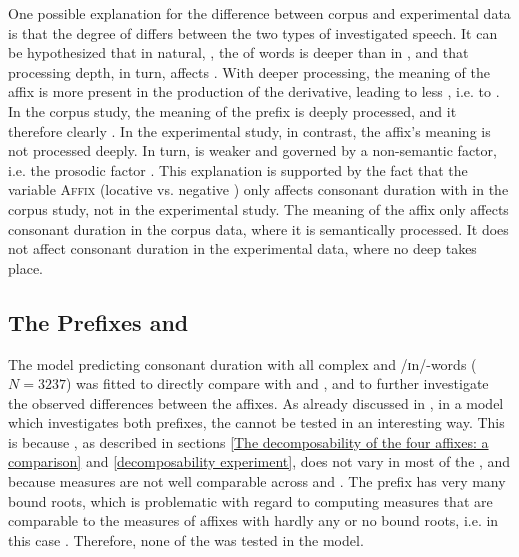 One possible explanation for the difference between corpus and experimental data is that the degree of  differs between the two types of investigated speech. It can be hypothesized that in natural, ,  the  of words is deeper than in , and that processing depth, in turn, affects . With deeper processing, the meaning of the affix is more present in the production of the derivative, leading to less , i.e. to . 
 In the corpus study, the meaning of the prefix is deeply processed, and it therefore clearly . In the experimental study, in contrast, the affix's meaning is not processed deeply. In turn,  is weaker and governed by a non-semantic factor,  i.e. the prosodic factor .
  This explanation is supported by the fact that the variable \textsc{Affix} (locative  vs. negative ) only affects consonant duration with  in the corpus study, not in the experimental study. The meaning of the affix only affects consonant duration in the corpus data, where it is semantically processed. It does not affect consonant duration in the experimental data, where no deep  takes place.





\subsection{The Prefixes  and }

The model predicting consonant duration with all complex  and /ɪn/-words ($N=3237$) was fitted to directly compare  with  and , and to further investigate the observed differences between the affixes.
As already discussed in , in a model which investigates both prefixes, the  cannot be tested in an interesting way. This is because , as described in sections \ref{The decomposability of the four affixes: a comparison} and \ref{decomposability experiment}, does not vary in most of the , and because  measures are not well comparable across  and . The prefix  has very many bound roots, which is problematic with regard to computing  measures that are comparable to the  measures of affixes with hardly any or no bound roots, i.e. in this case . Therefore, none of the  was tested in the model. 

